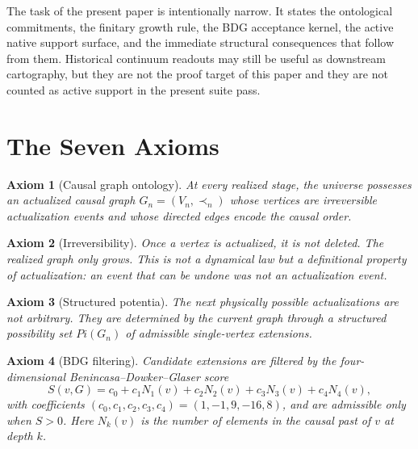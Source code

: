 \documentclass[11pt]{article}
\def\Pi{Pi}%
\newtheorem{axiom}{Axiom}
\newcommand{\Pot}{\Pi}
\begin{document}
The task of the present paper is intentionally narrow. It states the ontological commitments, the finitary growth rule, the BDG acceptance kernel, the active native support surface, and the immediate structural consequences that follow from them. Historical continuum readouts may still be useful as downstream cartography, but they are not the proof target of this paper and they are not counted as active support in the present suite pass.

\section{The Seven Axioms}
\label{sec:axioms}

\begin{axiom}[Causal graph ontology]
\label{ax:graph}
At every realized stage, the universe possesses an actualized causal graph $G_n=(V_n,\prec_n)$ whose vertices are irreversible actualization events and whose directed edges encode the causal order.
\end{axiom}

\begin{axiom}[Irreversibility]
\label{ax:irrev}
Once a vertex is actualized, it is not deleted. The realized graph only grows. This is not a dynamical law but a definitional property of actualization: an event that can be undone was not an actualization event.
\end{axiom}

\begin{axiom}[Structured potentia]
\label{ax:potentia}
The next physically possible actualizations are not arbitrary. They are determined by the current graph through a structured possibility set $\Pot(G_n)$ of admissible single-vertex extensions.
\end{axiom}

\begin{axiom}[BDG filtering]
\label{ax:bdg}
Candidate extensions are filtered by the four-dimensional Benincasa--Dowker--Glaser score
\begin{equation}
\label{eq:bdg}
S(v,G)=c_0 + c_1 N_1(v)+c_2 N_2(v)+c_3 N_3(v)+c_4 N_4(v),
\end{equation}
with coefficients $(c_0,c_1,c_2,c_3,c_4)=(1,-1,9,-16,8)$, and are admissible only when $S>0$. Here $N_k(v)$ is the number of elements in the causal past of $v$ at depth $k$.
\end{axiom}
\end{document}
